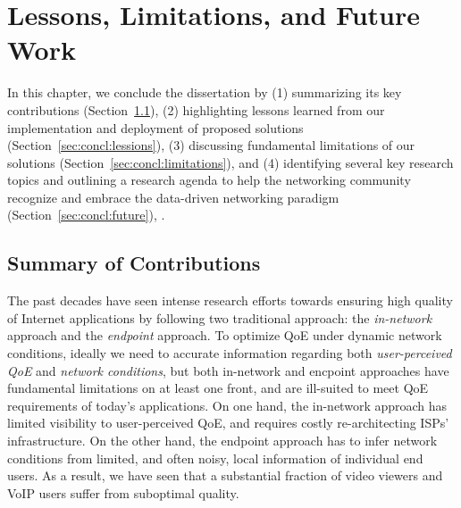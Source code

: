 \chapter{Lessons, Limitations, and Future Work}
\label{ch:concl}


In this chapter, we conclude the dissertation by 
(1) summarizing its key contributions (Section~\ref{sec:concl:contributions}), 
(2) highlighting lessons learned from our implementation and 
deployment of proposed solutions (Section~\ref{sec:concl:lessions}), 
(3) discussing fundamental limitations of our solutions (Section~\ref{sec:concl:limitations}), and
(4) identifying several key research topics and outlining a 
research agenda to help the networking community recognize 
and embrace the data-driven networking paradigm (Section~\ref{sec:concl:future}), .

\section{Summary of Contributions}
\label{sec:concl:contributions}

The past decades have seen intense research efforts towards ensuring high quality of 
Internet applications by following two traditional approach: the {\em in-network} approach 
and the {\em endpoint} approach.
To optimize QoE under dynamic network conditions, ideally we need to accurate information 
regarding both {\em user-perceived QoE} and {\em network conditions}, but both 
in-network and encpoint approaches have fundamental limitations on at least one front, 
and are ill-suited to meet QoE requirements of today's applications. 
On one hand, the in-network approach has limited visibility to user-perceived QoE, and 
requires costly re-architecting ISPs' infrastructure.
On the other hand, the endpoint approach has to infer network conditions from limited, 
and often noisy, local information of individual end users.
As a result, we have seen that a substantial fraction of video viewers and VoIP users 
suffer from suboptimal quality.

